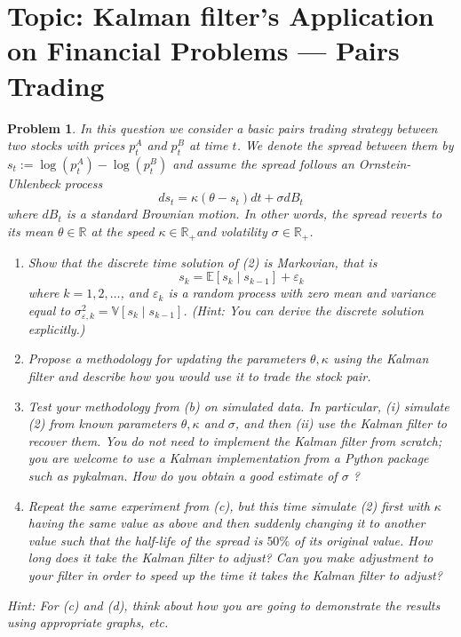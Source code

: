 \documentclass[11pt]{article}
\theoremstyle{plain} %
\newtheorem{problem}[theorem]{Problem}
\theoremstyle{remark}
\begin{document}
\section{Topic: Kalman filter's Application on Financial Problems --- Pairs Trading}
\begin{problem}
In this question we consider a basic pairs trading strategy between two stocks with prices $p_t^A$ and $p_t^B$ at time $t$. We denote the spread between them by $s_t:=\log \left(p_t^A\right)-\log \left(p_t^B\right)$ and assume the spread follows an Ornstein-Uhlenbeck process
$$
  d s_t=\kappa\left(\theta-s_t\right) d t+\sigma d B_t
$$
where $d B_t$ is a standard Brownian motion. In other words, the spread reverts to its mean $\theta \in \mathbb{R}$ at the speed $\kappa \in \mathbb{R}_{+}$and volatility $\sigma \in \mathbb{R}_{+}$.
\begin{enumerate}[label=(\alph*)]
  \item Show that the discrete time solution of (2) is Markovian, that is
        $$
          s_k=\mathbb{E}\left[s_k \mid s_{k-1}\right]+\varepsilon_k
        $$
        where $k=1,2, \ldots$, and $\varepsilon_k$ is a random process with zero mean and variance equal to $\sigma_{\varepsilon, k}^2=\mathbb{V}\left[s_k \mid s_{k-1}\right]$. (Hint: You can derive the discrete solution explicitly.)
  \item Propose a methodology for updating the parameters $\theta, \kappa$ using the Kalman filter and describe how you would use it to trade the stock pair.
  \item Test your methodology from (b) on simulated data. In particular, (i) simulate (2) from known parameters $\theta, \kappa$ and $\sigma$, and then (ii) use the Kalman filter to recover them. You do not need to implement the Kalman filter from scratch; you are welcome to use a Kalman implementation from a Python package such as pykalman. How do you obtain a good estimate of $\sigma$ ?
  \item Repeat the same experiment from (c), but this time simulate (2) first with $\kappa$ having the same value as above and then suddenly changing it to another value such that the half-life of the spread is $50 \%$ of its original value. How long does it take the Kalman filter to adjust? Can you make adjustment to your filter in order to speed up the time it takes the Kalman filter to adjust?
\end{enumerate}
Hint: For (c) and (d), think about how you are going to demonstrate the results using appropriate graphs, etc.
\end{problem}
\end{document}
